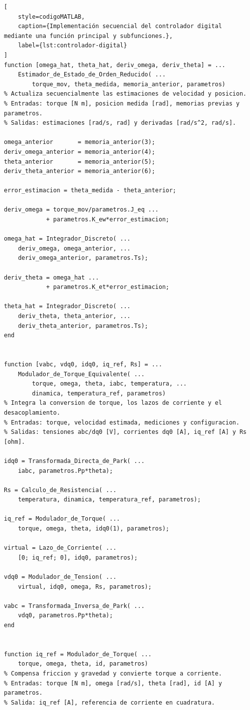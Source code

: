 \documentclass[blue,fullpaper]{ludusofficial}  %
\begin{document}
\begin{lstlisting}[
    style=codigoMATLAB,
    caption={Implementación secuencial del controlador digital mediante una función principal y subfunciones.},
    label={lst:controlador-digital}
]
function [omega_hat, theta_hat, deriv_omega, deriv_theta] = ...
    Estimador_de_Estado_de_Orden_Reducido( ...
        torque_mov, theta_medida, memoria_anterior, parametros)
% Actualiza secuencialmente las estimaciones de velocidad y posicion.
% Entradas: torque [N m], posicion medida [rad], memorias previas y parametros.
% Salidas: estimaciones [rad/s, rad] y derivadas [rad/s^2, rad/s].

omega_anterior       = memoria_anterior(3);
deriv_omega_anterior = memoria_anterior(4);
theta_anterior       = memoria_anterior(5);
deriv_theta_anterior = memoria_anterior(6);

error_estimacion = theta_medida - theta_anterior;

deriv_omega = torque_mov/parametros.J_eq ...
            + parametros.K_ew*error_estimacion;

omega_hat = Integrador_Discreto( ...
    deriv_omega, omega_anterior, ...
    deriv_omega_anterior, parametros.Ts);

deriv_theta = omega_hat ...
            + parametros.K_et*error_estimacion;

theta_hat = Integrador_Discreto( ...
    deriv_theta, theta_anterior, ...
    deriv_theta_anterior, parametros.Ts);
end


function [vabc, vdq0, idq0, iq_ref, Rs] = ...
    Modulador_de_Torque_Equivalente( ...
        torque, omega, theta, iabc, temperatura, ...
        dinamica, temperatura_ref, parametros)
% Integra la conversion de torque, los lazos de corriente y el desacoplamiento.
% Entradas: torque, velocidad estimada, mediciones y configuracion.
% Salidas: tensiones abc/dq0 [V], corrientes dq0 [A], iq_ref [A] y Rs [ohm].

idq0 = Transformada_Directa_de_Park( ...
    iabc, parametros.Pp*theta);

Rs = Calculo_de_Resistencia( ...
    temperatura, dinamica, temperatura_ref, parametros);

iq_ref = Modulador_de_Torque( ...
    torque, omega, theta, idq0(1), parametros);

virtual = Lazo_de_Corriente( ...
    [0; iq_ref; 0], idq0, parametros);

vdq0 = Modulador_de_Tension( ...
    virtual, idq0, omega, Rs, parametros);

vabc = Transformada_Inversa_de_Park( ...
    vdq0, parametros.Pp*theta);
end


function iq_ref = Modulador_de_Torque( ...
    torque, omega, theta, id, parametros)
% Compensa friccion y gravedad y convierte torque a corriente.
% Entradas: torque [N m], omega [rad/s], theta [rad], id [A] y parametros.
% Salida: iq_ref [A], referencia de corriente en cuadratura.


\end{lstlisting}
\end{document}
